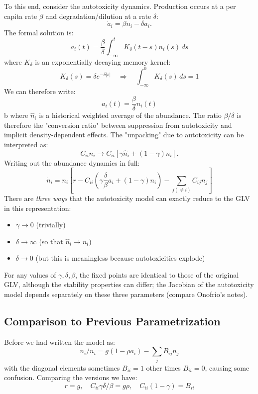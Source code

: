 \documentclass{article}
\begin{document}
To this end, consider the autotoxicity dynamics. Production occurs at a per capita rate $\beta$ and degradation/dilution at a rate $\delta$:
\begin{equation}
\dot{a}_i = \beta n_i - \delta a_i.
\end{equation}
The formal solution is:
\begin{equation}
a_i(t) = \frac{\beta}{\delta} \int_{-\infty}^t K_\delta(t-s) n_i(s)\, ds
\end{equation}
where $K_\delta$ is an exponentially decaying memory kernel:
\begin{equation}
K_\delta(s) = \delta e^{-\delta|s|} \quad \Rightarrow \quad \int_{-\infty}^0 K_\delta(s)\, ds = 1
\end{equation}
We can therefore write:
\begin{equation}
a_i(t) = \frac{\beta}{\delta}\hat{n}_i(t)
\end{equation}b
where $\hat{n}_i$ is a historical weighted average of the abundance. The ratio $\beta/\delta$ is therefore the "conversion ratio" between suppression from autotoxicity and implicit density-dependent effects. The "unpacking" due to autotoxicity can be interpreted as:
\begin{equation}
C_{ii}n_i \rightarrow C_{ii}\left[ \gamma \hat{n}_i + (1-\gamma)n_i \right].
\end{equation}
Writing out the abundance dynamics in full:
\begin{equation}
\dot{n}_i = n_i\left[ r - C_{ii} \left(\gamma \frac{\delta}{\beta}a_i + (1-\gamma)n_i\right) - \sum_{j(\neq i)} C_{ij} n_j \right]
\end{equation}
There are \emph{three ways} that the autotoxicity model can exactly reduce to the GLV in this representation:
\begin{itemize}
  \item $\gamma \to 0$ (trivially)
  \item $\delta \to \infty$ (so that $\hat{n}_i \to n_i$)
  \item $\delta \to 0$ (but this is meaningless because autotoxicities explode)
\end{itemize}
For any values of $\gamma,\delta,\beta$, the fixed points are identical to those of the original GLV, although the stability properties can differ; the Jacobian of the autotoxicity model depends separately on these three parameters (compare Onofrio's notes).

\subsection{Comparison to Previous Parametrization}
Before we had written the model as:
\begin{equation}
\dot{n}_i / n_i = g ( 1 - \rho a_i ) - \sum_{j} B_{ij} n_j
\end{equation}
with the diagonal elements sometimes $B_{ii}=1$ other times $B_{ii}=0$, causing some confusion. Comparing the versions we have:
\begin{equation}
r=g, \quad C_{ii} \gamma \delta/\beta = g \rho, \quad C_{ii}(1-\gamma) = B_{ii}
\end{equation}
\end{document}
